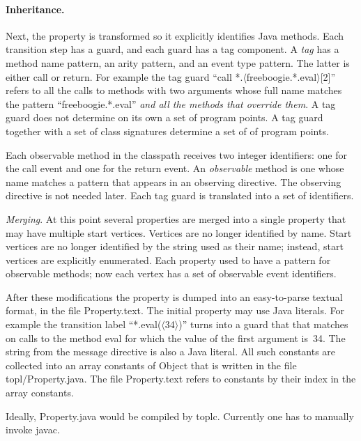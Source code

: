 \documentclass{article} %
\begin{document}
\paragraph{Inheritance.}
Next, the property is transformed so it explicitly identifies Java methods.
Each transition step has a guard, and each guard has a tag component.
A \emph{tag} has a method name pattern, an arity pattern, and an event type pattern.
The latter is either \textsf{call} or \textsf{return}.
For example the tag guard ``\textsf{call *.$\langle$freeboogie.*.eval$\rangle$[2]}'' refers to all the calls to methods with two arguments whose full name matches the pattern ``\textsf{freeboogie.*.eval}'' \emph{and all the methods that override them}.
A tag guard does not determine on its own a set of program points.
A tag guard together with a set of class signatures determine a set of of program points.

Each observable method in the classpath receives two integer identifiers: one for the call event and one for the return event.
An \emph{observable} method is one whose name matches a pattern that appears in an \textsf{observing} directive.
The \textsf{observing} directive is not needed later.
Each tag guard is translated into a set of identifiers.

\textit{Merging}. At this point several properties are merged into a single property that may have multiple start vertices.
Vertices are no longer identified by name.
Start vertices are no longer identified by the string used as their name; instead, start vertices are explicitly enumerated.
Each property used to have a pattern for observable methods;
now each vertex has a set of observable event identifiers.

After these modifications the property is dumped into an easy-to-parse textual format, in the file \textsf{Property.text}.
The initial property may use Java literals.
For example the transition label ``\textsf{*.eval($\langle$34$\rangle$)}'' turns into a guard that that matches on calls to the method \textsf{eval} for which the value of the first argument is~\textsf{34}.
The string from the \textsf{message} directive is also a Java literal.
All such constants are collected into an array \textsf{constants} of \textsf{Object} that is written in the file \textsf{topl/Property.java}.
The file \textsf{Property.text} refers to constants by their index in the array \textsf{constants}.

Ideally, \textsf{Property.java} would be compiled by \textsf{toplc}.
Currently one has to manually invoke \textsf{javac}.
\end{document}

